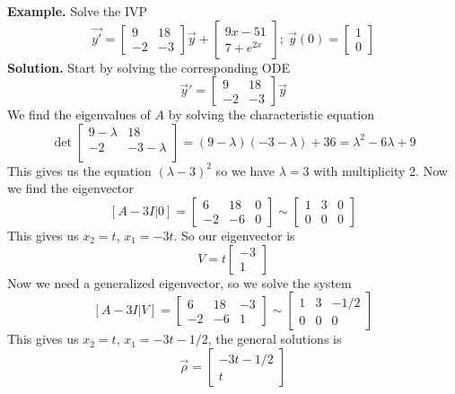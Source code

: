 \documentclass[openany]{report}
\begin{document}
\textbf{Example.} Solve the IVP 
\[\vec{y'} = \begin{bmatrix}
    9 & 18\\
    -2 & -3
\end{bmatrix}\vec{y} + \begin{bmatrix}
    9x - 51\\
    7 + e^{2x}
\end{bmatrix}; \ \vec{y}(0) = \begin{bmatrix}
    1\\
    0
\end{bmatrix}\]
\textbf{Solution.} Start by solving the corresponding ODE
\[\vec{y}' = \begin{bmatrix}
    9 & 18\\
    -2 & -3
\end{bmatrix}\vec{y}\]
We find the eigenvalues of $A$ by solving the characteristic equation
\[\det\begin{bmatrix}
    9 - \lambda & 18\\
    -2 & -3 - \lambda\\
\end{bmatrix} = (9 - \lambda)(-3-\lambda) + 36 = \lambda^2 -6\lambda + 9\]
This gives us the equation $(\lambda -3)^2$ so we have $\lambda = 3$ with multiplicity 2. Now we find the eigenvector 
\[[A - 3I| 0] = \begin{bmatrix}
    6 & 18 & 0\\
    -2 & -6 & 0
\end{bmatrix} \sim \begin{bmatrix}
    1 & 3 & 0\\
    0 & 0 & 0
\end{bmatrix}\]
This gives us $x_2 = t$, $x_1 = -3t$. So our eigenvector is 
\[V = t\begin{bmatrix}
    -3\\
    1
\end{bmatrix}\]
Now we need a generalized eigenvector, so we solve the system
\[[A - 3I| V] = \begin{bmatrix}
    6 & 18 & -3\\
    -2 & -6 & 1
\end{bmatrix} \sim \begin{bmatrix}
    1 & 3 & -1/2\\
    0 & 0 & 0
\end{bmatrix}\]
This gives us $x_2 = t$, $x_1 = -3t - 1/2$, the general solutions is 
\[\vec{\rho} = \begin{bmatrix}
    -3t - 1/2\\
    t
\end{bmatrix}\]
\end{document}
